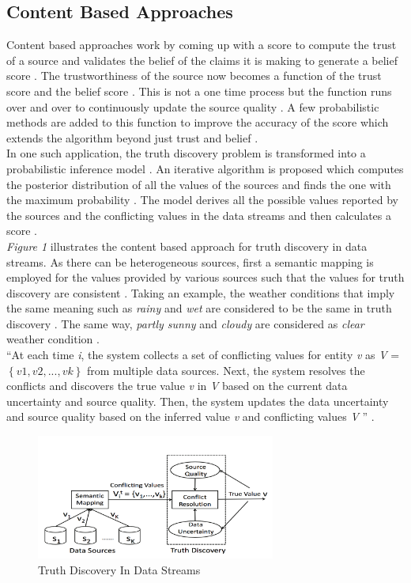\documentclass[sigconf]{acmart}
\begin{document}
\subsection{Content Based Approaches}
Content based approaches work by coming up with a score to compute the trust of a source and validates the belief of the claims it is making to generate a belief score \cite{Berti-Equille2016}. The trustworthiness of the source now becomes a function of the trust score and the belief score \cite{Berti-Equille2016}. This is not a one time process but the function runs over and over to continuously update the source quality \cite{Berti-Equille2016}. A few probabilistic methods are added to this function to improve the accuracy of the score which extends the algorithm beyond just trust and belief \cite{Berti-Equille2016}. \\ In one such application, the truth discovery problem is transformed into a probabilistic inference model \cite{Zhao2014}. An iterative algorithm is proposed which computes the posterior distribution of all the values of the sources and finds the one with the maximum probability \cite{Zhao2014}. The model derives all the possible values reported by the sources and the conflicting values in the data streams and then calculates a score \cite{Zhao2014}. \\
{\em Figure 1} illustrates the content based approach for truth discovery in data streams. As there can be heterogeneous sources, first a semantic mapping is employed for the values provided by various sources such that the values for truth discovery are consistent \cite{Zhao2014}. Taking an example, the weather conditions that imply the same meaning such as {\em rainy} and {\em wet} are considered to be the same in truth discovery \cite{Zhao2014}. The same way, {\em partly sunny} and {\em cloudy} are considered as {\em clear} weather condition \cite{Zhao2014}. \\
``At each time {\em i}, the system collects a set of conflicting
values for entity {\em v} as {\em V} = $\left\{{v1,v2,...,vk}\right\}$ from multiple data sources. Next, the system resolves the conflicts and discovers the true value {\em v} in {\em V} based on the current data uncertainty and source quality. Then, the system updates the data uncertainty and source quality based on the inferred value {\em v} and conflicting values {\em V} '' \cite{Zhao2014}.

\begin{figure}
\includegraphics[width=0.7\textwidth]{images/fig1.png}
\caption{Truth Discovery In Data Streams \cite{Zhao2014}}
\end{figure}
\end{document}
